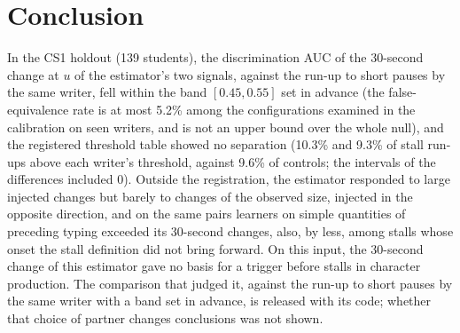 \section{Conclusion}
\label{sec:conclusion}

In the CS1 holdout (139 students), the discrimination AUC of the 30-second change at $u$ of the estimator's two signals,
against the run-up to short pauses by the same writer, fell within the band $[0.45, 0.55]$ set in advance (the
false-equivalence rate is at most 5.2\% among the configurations examined in the calibration on seen writers, and is
not an upper bound over the whole null), and the registered
threshold table showed no separation (10.3\% and 9.3\% of stall run-ups above each writer's threshold, against 9.6\% of
controls; the intervals of the differences included 0). Outside the registration, the estimator responded to large injected changes but barely to changes of the
observed size, injected in the opposite direction, and on the same pairs learners on simple quantities of preceding
typing exceeded its 30-second changes, also, by less, among stalls whose onset the stall definition did not bring forward.
On this input, the 30-second change of this estimator gave no basis for a trigger before stalls in character production.
The comparison that judged it, against the run-up to short pauses by the same writer with a band set in advance, is
released with its code; whether that choice of partner changes conclusions was not shown.
